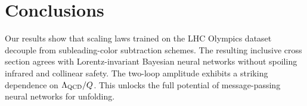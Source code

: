 \section{Conclusions}\label{sec:conclusions}

Our results show that scaling laws trained on the LHC Olympics dataset
decouple from subleading-color subtraction schemes. The resulting
inclusive cross section agrees with Lorentz-invariant Bayesian neural
networks without spoiling infrared and collinear safety. The two-loop
amplitude exhibits a striking dependence on $\Lambda_{\rm QCD}/Q$. This
unlocks the full potential of message-passing neural networks for
unfolding.

